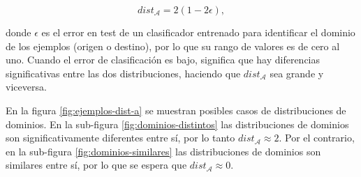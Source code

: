 \begin{equation}
    dist_\mathcal{A} = 2 (1-2\epsilon),
\end{equation}

\noindent
donde $\epsilon$ es el error en test de un clasificador entrenado para identificar el dominio de los ejemplos (origen o destino), por lo que su rango de valores es de cero al uno.
Cuando el error de clasificación es bajo, significa que hay diferencias significativas entre las dos distribuciones,
haciendo que $dist_\mathcal{A}$ sea grande y viceversa.

En la figura \ref{fig:ejemplos-dist-a} se muestran posibles casos de distribuciones de dominios. En la sub-figura
\ref{fig:dominios-distintos} las distribuciones de dominios son significativamente diferentes entre sí, por lo tanto
$dist_\mathcal{A} \approx 2$. Por el contrario, en la sub-figura \ref{fig:dominios-similares} las distribuciones de
dominios son similares entre sí, por lo que se espera que $dist_\mathcal{A} \approx 0$.

